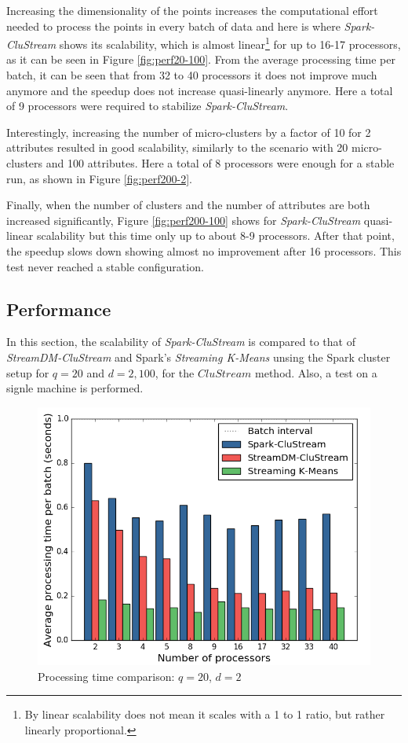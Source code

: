 \addtocounter{figure}{-1}
Increasing the dimensionality of the points increases the computational effort needed to process the points in every batch of data and here is where \textit{Spark-CluStream} shows its scalability, which is almost linear\footnote{By linear scalability does not mean it scales with a 1 to 1 ratio, but rather linearly proportional.} for up to 16-17 processors, as it can be seen in Figure \ref{fig:perf20-100}.  From the average processing time per batch, it can be seen that from 32 to 40 processors it does not improve much anymore and the speedup does not increase quasi-linearly anymore. Here a total of 9 processors were required to stabilize \textit{Spark-CluStream}. 


Interestingly, increasing the number of micro-clusters by a factor of 10 for 2 attributes resulted in good scalability, similarly to the scenario with 20 micro-clusters and 100 attributes. Here a total of 8 processors were enough for a stable run, as shown in Figure \ref{fig:perf200-2}.



Finally, when the number of clusters and the number of attributes are both increased significantly, Figure \ref{fig:perf200-100} shows for \textit{Spark-CluStream} quasi-linear scalability but this time only up to about 8-9 processors. After that point, the speedup slows down showing almost no improvement after 16 processors. This test never reached a stable configuration.


\subsection{Performance}

In this section, the scalability of \textit{Spark-CluStream} is compared to that of \textit{StreamDM-CluStream} and Spark's \textit{Streaming K-Means} unsing the Spark cluster setup for $q=20$ and $d=2,100$, for the $CluStream$ method. Also, a test on a signle machine is performed.


\begin{figure}[h!]
 \centering
 \includegraphics[scale=0.45]{./styles/perfComp2.png}
 \caption{Processing time comparison: $q=20$, $d=2$}
 \label{fig:perfComp2}
\end{figure}

